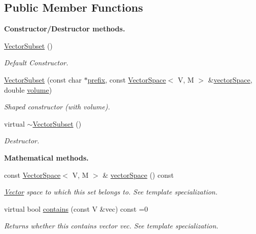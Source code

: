 \subsection*{Public Member Functions}
\begin{Indent}{\bf Constructor/\-Destructor methods.}\par
\begin{DoxyCompactItemize}
\item 
\hyperlink{class_q_u_e_s_o_1_1_vector_subset_a68256de927befecd2694f873dead247a}{Vector\-Subset} ()
\begin{DoxyCompactList}\small\item\em Default Constructor. \end{DoxyCompactList}\item 
\hyperlink{class_q_u_e_s_o_1_1_vector_subset_a274c03af88db6d0c183c1b3acfa0d6bd}{Vector\-Subset} (const char $\ast$\hyperlink{class_q_u_e_s_o_1_1_vector_set_aedcd4b0f502af4c6e6df863c13cddfec}{prefix}, const \hyperlink{class_q_u_e_s_o_1_1_vector_space}{Vector\-Space}$<$ V, M $>$ \&\hyperlink{class_q_u_e_s_o_1_1_vector_subset_afc859b5206bc056c66893c854c191959}{vector\-Space}, double \hyperlink{class_q_u_e_s_o_1_1_vector_set_a3266f16e2672f5f3c929f22df085e545}{volume})
\begin{DoxyCompactList}\small\item\em Shaped constructor (with volume). \end{DoxyCompactList}\item 
virtual \hyperlink{class_q_u_e_s_o_1_1_vector_subset_a428561193ebdb3a4cce0bca42656815b}{$\sim$\-Vector\-Subset} ()
\begin{DoxyCompactList}\small\item\em Destructor. \end{DoxyCompactList}\end{DoxyCompactItemize}
\end{Indent}
\begin{Indent}{\bf Mathematical methods.}\par
\begin{DoxyCompactItemize}
\item 
const \hyperlink{class_q_u_e_s_o_1_1_vector_space}{Vector\-Space}$<$ V, M $>$ \& \hyperlink{class_q_u_e_s_o_1_1_vector_subset_afc859b5206bc056c66893c854c191959}{vector\-Space} () const 
\begin{DoxyCompactList}\small\item\em \hyperlink{class_q_u_e_s_o_1_1_vector}{Vector} space to which {\ttfamily this} set belongs to. See template specialization. \end{DoxyCompactList}\item 
virtual bool \hyperlink{class_q_u_e_s_o_1_1_vector_subset_aa3f018d2afdf73dbe5fa7041dee47e0d}{contains} (const V \&vec) const =0
\begin{DoxyCompactList}\small\item\em Returns whether {\ttfamily this} contains vector {\ttfamily vec}. See template specialization. \end{DoxyCompactList}\end{DoxyCompactItemize}
\end{Indent}
